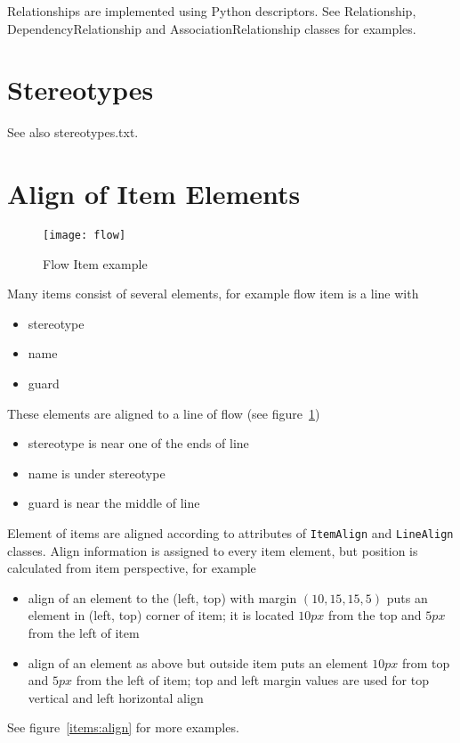 \documentclass{article}
\newcommand{\class}[1]{\texttt{#1}}
\begin{document}
Relationships are implemented using Python descriptors. See Relationship,
DependencyRelationship and AssociationRelationship classes for examples.

\section{Stereotypes}
See also stereotypes.txt.

\section{Align of Item Elements}

\begin{figure}
\begin{center}
\texttt{[image: flow]}
\end{center}
\caption{Flow Item example}\label{items:example:flow}
\end{figure}

Many items consist of several elements, for example flow item is a line
with
\begin{itemize}
\item stereotype
\item name
\item guard
\end{itemize}
These elements are aligned to a line of flow (see
figure~\ref{items:example:flow})
\begin{itemize}
\item stereotype is near one of the ends of line
\item name is under stereotype
\item guard is near the middle of line
\end{itemize}

Element of items are aligned according to attributes of
\class{ItemAlign} and \class{LineAlign} classes. Align information is
assigned to every item element, but position is calculated from item
perspective, for example
\begin{itemize}
\item align of an element to the (left, top) with margin $(10, 15, 15, 5)$
puts an element in (left, top) corner of item; it is located $10px$ from the top
and $5px$ from the left of item
\item align of an element as above but outside item puts an element $10px$
from top and $5px$ from the left of item; top and left margin values are
used for top vertical and left horizontal align
\end{itemize}
See figure~\ref{items:align} for more examples.
\end{document}

